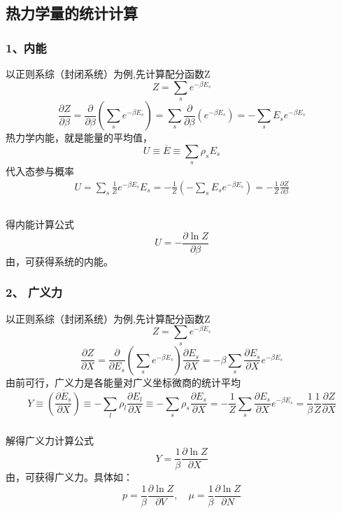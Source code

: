 \subsection{热力学量的统计计算}

\begin{frame}
  \frametitle{ 1、内能}
  以正则系综（封闭系统）为例,先计算配分函数Z
  \[ Z = \sum_s e^{-\beta E_s}\]
  \[ \frac{\partial Z}{\partial \beta } = \frac{\partial }{\partial \beta } (\sum_s e^{-\beta E_s})
    = \sum_s \frac{\partial }{\partial \beta } ( e^{-\beta E_s}) =  - \sum_s E_s e^{-\beta E_s} \]
  热力学内能，就是能量的平均值，
  \[ U \equiv \overline{E} \equiv  \sum_s \rho _s E_s \]
  代入态参与概率
  \[ \begin{aligned}
    U = \sum_s \frac{1}{Z} e^{-\beta E_s} E_s = -\frac{1}{Z} ( - \sum_s E_s e^{-\beta E_s} )  = - \frac{1}{Z} \frac{\partial Z}{\partial \beta } \\ 
  \end{aligned}\]
\end{frame} 

\begin{frame}
  \frametitle{}
  得内能计算公式
  \[ \boxed{U = -  \frac{\partial \ln Z}{\partial \beta }} \]
  由\emf[配分函数$Z$] ，可获得系统的内能。
\end{frame} 

\begin{frame}
  \frametitle{ 2、 广义力 }
  以正则系综（封闭系统）为例,先计算配分函数Z
  \[ Z = \sum_s e^{-\beta E_s}\]
  \[ \frac{\partial Z}{\partial X } = \frac{\partial }{\partial E_s} (\sum_s e^{-\beta E_s}) \frac{\partial E_s}{\partial X } 
    = - \beta \sum_s \frac{\partial E_s}{\partial X } e^{-\beta E_s} \]
  由前可行，广义力是各能量对广义坐标微商的统计平均 
  \[Y \equiv  \overline{(\frac{\partial E_s}{\partial X })} \equiv  - \sum_l \rho _l \frac{\partial E_l }{\partial X} \equiv - \sum_s \rho _s \frac{\partial E_s }{\partial X} = - \frac{1}{Z} \sum_s \frac{\partial E_s }{\partial X} e^{-\beta E_s}  = \frac{1}{\beta} \frac{1}{Z} \frac{\partial Z}{\partial X }\] 
\end{frame}

 \begin{frame}
   \frametitle{}
解得广义力计算公式
\[ \boxed{Y = \frac{1}{\beta} \frac{\partial \ln Z}{\partial X }} \]
由\emf[配分函数$Z$] ，可获得广义力。具体如：
\[ \boxed{p = \frac{1}{\beta} \frac{\partial \ln Z}{\partial V }}, \quad  \boxed{\mu = \frac{1}{\beta} \frac{\partial \ln Z}{\partial N }} \]
 \end{frame} 

